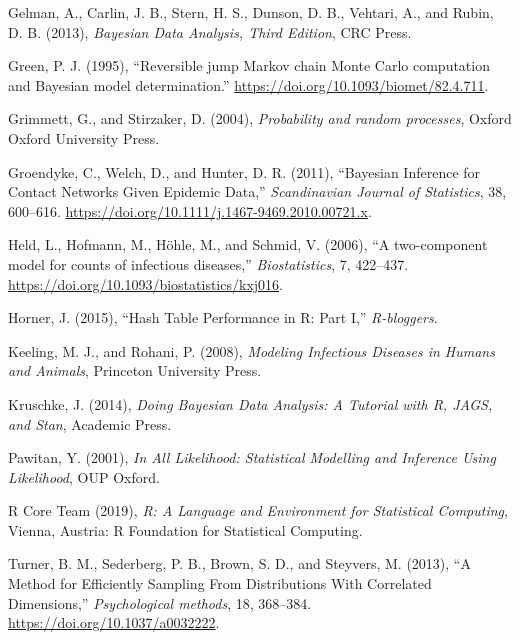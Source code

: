 \documentclass[11pt,a4paper]{article}
\numberwithin{equation}{section}
\begin{document}
\leavevmode\hypertarget{ref-gelman_bayesian_2013}{}%
Gelman, A., Carlin, J. B., Stern, H. S., Dunson, D. B., Vehtari, A., and
Rubin, D. B. (2013), \emph{Bayesian Data Analysis, Third Edition}, CRC
Press.

\leavevmode\hypertarget{ref-green_reversible_1995}{}%
Green, P. J. (1995), ``Reversible jump Markov chain Monte Carlo
computation and Bayesian model determination.''
\url{https://doi.org/10.1093/biomet/82.4.711}.

\leavevmode\hypertarget{ref-grimmett_probability_2004}{}%
Grimmett, G., and Stirzaker, D. (2004), \emph{Probability and random
processes}, Oxford Oxford University Press.

\leavevmode\hypertarget{ref-groendyke_bayesian_2011}{}%
Groendyke, C., Welch, D., and Hunter, D. R. (2011), ``Bayesian Inference
for Contact Networks Given Epidemic Data,'' \emph{Scandinavian Journal
of Statistics}, 38, 600--616.
\url{https://doi.org/10.1111/j.1467-9469.2010.00721.x}.

\leavevmode\hypertarget{ref-held_two-component_2006}{}%
Held, L., Hofmann, M., Höhle, M., and Schmid, V. (2006), ``A
two-component model for counts of infectious diseases,''
\emph{Biostatistics}, 7, 422--437.
\url{https://doi.org/10.1093/biostatistics/kxj016}.

\leavevmode\hypertarget{ref-horner_hash_2015}{}%
Horner, J. (2015), ``Hash Table Performance in R: Part I,''
\emph{R-bloggers}.

\leavevmode\hypertarget{ref-keeling_modeling_2008}{}%
Keeling, M. J., and Rohani, P. (2008), \emph{Modeling Infectious
Diseases in Humans and Animals}, Princeton University Press.

\leavevmode\hypertarget{ref-kruschke_doing_2014}{}%
Kruschke, J. (2014), \emph{Doing Bayesian Data Analysis: A Tutorial with
R, JAGS, and Stan}, Academic Press.

\leavevmode\hypertarget{ref-pawitan_all_2001}{}%
Pawitan, Y. (2001), \emph{In All Likelihood: Statistical Modelling and
Inference Using Likelihood}, OUP Oxford.

\leavevmode\hypertarget{ref-r_core_team_r_2019}{}%
R Core Team (2019), \emph{R: A Language and Environment for Statistical
Computing}, Vienna, Austria: R Foundation for Statistical Computing.

\leavevmode\hypertarget{ref-turner_method_2013}{}%
Turner, B. M., Sederberg, P. B., Brown, S. D., and Steyvers, M. (2013),
``A Method for Efficiently Sampling From Distributions With Correlated
Dimensions,'' \emph{Psychological methods}, 18, 368--384.
\url{https://doi.org/10.1037/a0032222}.
\end{document}
